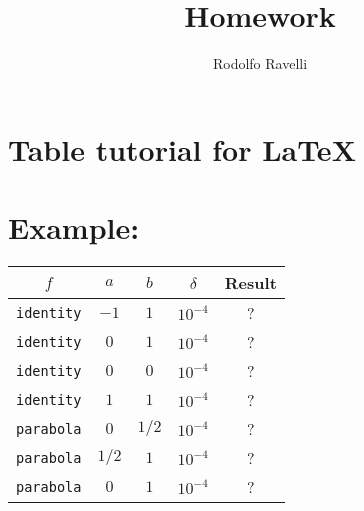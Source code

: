 \documentclass[12pt]{article}
\title{Homework}
\author{Rodolfo Ravelli}
\begin{document}
\maketitle
\thispagestyle{empty}
\section*{Table tutorial for LaTeX}
\vspace{2mm}
\hspace{1mm}{\large Learning Exercise.}

\section*{Example:}

\begin{center}
\begin{tabular}{ccccc}
$f$ & $a$ & $b$ & $\delta$ & Result \\ \hline
\texttt{identity} & $-1$ & $1$ & $10^{-4}$ & ? \\
\texttt{identity} & $0$ & $1$ & $10^{-4}$ & ? \\
\texttt{identity} & $0$ & $0$ & $10^{-4}$ & ? \\
\texttt{identity} & $1$ & $1$ & $10^{-4}$ & ? \\
\texttt{parabola} & $0$ & $1/2$ & $10^{-4}$ & ? \\
\texttt{parabola} & $1/2$ & $1$ & $10^{-4}$ & ? \\
\texttt{parabola} & $0$ & $1$ & $10^{-4}$ & ?
\end{tabular}
\end{center}
\end{document}

